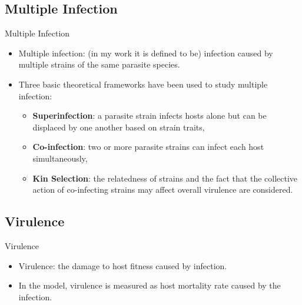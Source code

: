 \documentclass{beamer}
\begin{document}
	\subsection{Multiple Infection}
	\begin{frame}{Multiple Infection}
		\begin{itemize}
			\item Multiple infection: (in my work it is defined to be) infection caused by multiple strains of the same parasite species. 
			\vspace{1em}
			\item Three basic theoretical frameworks have been used to study multiple infection:
			\vspace{1em}
			\begin{itemize}
				\item \textbf{Superinfection}: a parasite strain infects hosts alone but can be displaced by one another based on strain traits,
				\item \textbf{Co-infection}: two or more parasite strains can infect each host simultaneously,
				\item \textbf{Kin Selection}: the relatedness of strains and the fact that the collective action of co-infecting strains may affect overall virulence are considered.
			\end{itemize}
		\end{itemize}
	\end{frame}

	\subsection{Virulence}
	\begin{frame}{Virulence}
		\begin{itemize}
			\item Virulence: the damage to host fitness caused by infection.
			\vspace{1em}
			\item In the model, virulence is measured as host mortality rate caused by the infection.
		\end{itemize}
	\end{frame}
	
\end{document}
